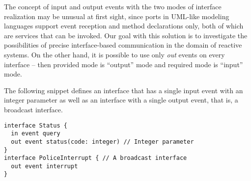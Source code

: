 The concept of input and output events with the two modes of interface realization may be unusual at first sight, since ports in UML-like modeling languages support event reception and method declarations only, both of which are services that can be invoked. Our goal with this solution is to investigate the possibilities of precise interface-based communication in the domain of reactive systems. On the other hand, it is possible to use only \emph{out} events on every interface -- then provided mode is ``output'' mode and required
mode is ``input'' mode.

The following snippet defines an interface that has a single input event with an integer parameter as well as an interface with a single output event, that is, a broadcast interface. 
\begin{lstlisting}
interface Status {
  in event query
  out event status(code: integer) // Integer parameter
}
interface PoliceInterrupt { // A broadcast interface
  out event interrupt
}
\end{lstlisting}

%

